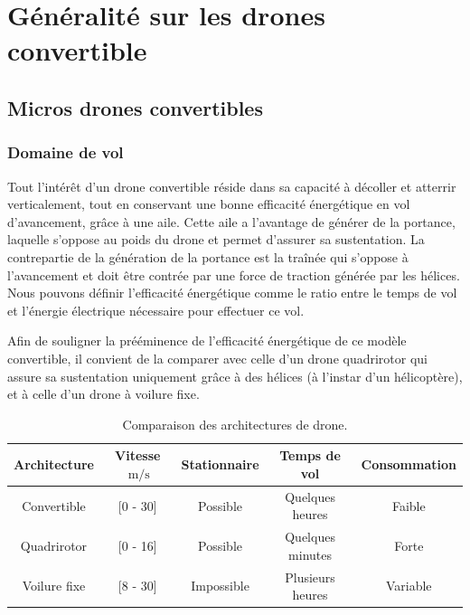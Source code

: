 \chapter{Généralité sur les drones convertible}
\minitoc
\label{chap:generalites}


\section{Micros drones convertibles}

    \subsection{Domaine de vol} 
    Tout l'intérêt d'un drone convertible réside dans sa capacité à décoller et atterrir verticalement, tout en conservant une bonne efficacité énergétique en vol d'avancement, grâce à une aile. Cette aile a l'avantage de générer de la portance, laquelle s'oppose au poids du drone et permet d'assurer sa sustentation. La contrepartie de la génération de la portance est la traînée qui s'oppose à l'avancement et doit être contrée par une force de traction générée par les hélices. Nous pouvons définir l'efficacité énergétique comme le ratio entre le temps de vol et l'énergie électrique nécessaire pour effectuer ce vol.
    
    Afin de souligner la prééminence de l'efficacité énergétique de ce modèle convertible, il convient de la comparer avec celle d'un drone quadrirotor qui assure sa sustentation uniquement grâce à des hélices (à l'instar d'un hélicoptère), et à celle d'un drone à voilure fixe.
    \begin{table}[ht]
        \centering
        \begin{tabular}{|c|c|c|c|c|}
            \hline
            Architecture & Vitesse $\SI{}{\meter\per\second}$  & Stationnaire & Temps de vol & Consommation\\
            \hline \hline
            Convertible & [0 - 30] & Possible & Quelques heures & Faible\\
            \hline
            Quadrirotor & [0 - 16] & Possible& Quelques minutes & Forte\\
            \hline
            Voilure fixe & [8 - 30] & Impossible & Plusieurs heures & Variable \\
            \hline
        \end{tabular}
        \caption{Comparaison des architectures de drone.}
    \end{table}

